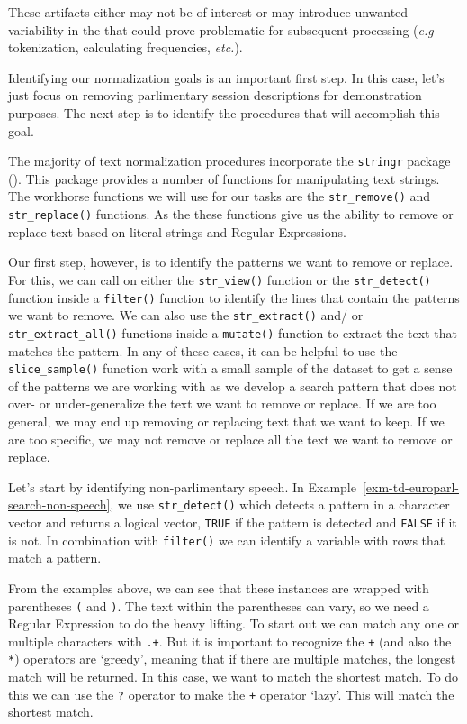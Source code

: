 \documentclass[
  letterpaper,
  DIV=11,
  numbers=noendperiod]{scrreprt}
\theoremstyle{definition}
\theoremstyle{remark}
\begin{document}
These artifacts either may not be of interest or may introduce unwanted
variability in the that could prove problematic for subsequent
processing (\emph{e.g} tokenization, calculating frequencies,
\emph{etc.}).

Identifying our normalization goals is an important first step. In this
case, let's just focus on removing parlimentary session descriptions for
demonstration purposes. The next step is to identify the procedures that
will accomplish this goal.

The majority of text normalization procedures incorporate the
\texttt{stringr} package (). This
package provides a number of functions for manipulating text strings.
The workhorse functions we will use for our tasks are the
\texttt{str\_remove()} and \texttt{str\_replace()} functions. As the
these functions give us the ability to remove or replace text based on
literal strings and Regular Expressions.

Our first step, however, is to identify the patterns we want to remove
or replace. For this, we can call on either the \texttt{str\_view()}
function or the \texttt{str\_detect()} function inside a
\texttt{filter()} function to identify the lines that contain the
patterns we want to remove. We can also use the \texttt{str\_extract()}
and/ or \texttt{str\_extract\_all()} functions inside a
\texttt{mutate()} function to extract the text that matches the pattern.
In any of these cases, it can be helpful to use the
\texttt{slice\_sample()} function work with a small sample of the
dataset to get a sense of the patterns we are working with as we develop
a search pattern that does not over- or under-generalize the text we
want to remove or replace. If we are too general, we may end up removing
or replacing text that we want to keep. If we are too specific, we may
not remove or replace all the text we want to remove or replace.

Let's start by identifying non-parlimentary speech. In
Example~\ref{exm-td-europarl-search-non-speech}, we use
\texttt{str\_detect()} which detects a pattern in a character vector and
returns a logical vector, \texttt{TRUE} if the pattern is detected and
\texttt{FALSE} if it is not. In combination with \texttt{filter()} we
can identify a variable with rows that match a pattern.

From the examples above, we can see that these instances are wrapped
with parentheses \texttt{(} and \texttt{)}. The text within the
parentheses can vary, so we need a Regular Expression to do the heavy
lifting. To start out we can match any one or multiple characters with
\texttt{.+}. But it is important to recognize the \texttt{+} (and also
the \texttt{*}) operators are `greedy', meaning that if there are
multiple matches, the longest match will be returned. In this case, we
want to match the shortest match. To do this we can use the \texttt{?}
operator to make the \texttt{+} operator `lazy'. This will match the
shortest match.
\end{document}
